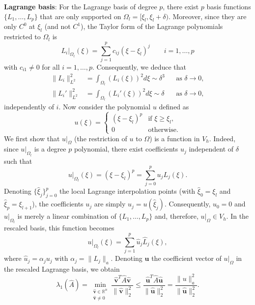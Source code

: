 \documentclass{article}
\numberwithin{equation}{section}
\newcommand{\dxi}{d\xi}
\newcommand{\restr}[2]{\left.{#1}\right|_{#2}}
\theoremstyle{definition}
\begin{document}
\noindent \textbf{Lagrange basis}:
For the Lagrange basis of degree $p$, there exist $p$ basis functions $\{L_1,\dots,L_p\}$ that are only supported on $\Omega_l = [\xi_l,\xi_l+\delta)$. Moreover, since they are only $C^0$ at $\xi_l$ (and not $C^1$), the Taylor form of the Lagrange polynomials restricted to $\Omega_l$ is
\begin{equation*}
    \restr{L_i}{\Omega_l}(\xi) = \sum_{j=1}^p c_{ij}(\xi-\xi_l)^j \qquad i=1,\dots,p
\end{equation*}
with $c_{i1} \neq 0$ for all $i=1,\dots,p$. Consequently, we deduce that
\begin{align}
    \|L_i\|_{L^2}^2 &= \int_{\Omega_l} (L_i(\xi))^2 \dxi \sim \delta^{3} & &\text{as } \delta \to 0, \label{eq: L2_Lagrange} \\
    \|L_i'\|_{L^2}^2 &= \int_{\Omega_l} (L_i'(\xi))^2 \dxi \sim \delta & &\text{as } \delta \to 0, \label{eq: H1_Lagrange}
\end{align}
independently of $i$. Now consider the polynomial $u$ defined as
\begin{equation*}
    u(\xi) =
    \begin{cases}
        (\xi-\xi_l)^p & \text{if } \xi \geq \xi_l, \\
        0 & \text{otherwise}.
    \end{cases}
\end{equation*}
We first show that $\restr{u}{\Omega}$ (the restriction of $u$ to $\Omega$) is a function in $V_h$. Indeed, since $\restr{u}{\Omega_l}$ is a degree $p$ polynomial, there exist coefficients $u_j$ independent of $\delta$ such that
\begin{equation*}
    \restr{u}{\Omega_l}(\xi) = (\xi-\xi_l)^p = \sum_{j=0}^p u_j L_j(\xi).
\end{equation*}
Denoting $\{\hat{\xi}_j\}_{j=0}^p$ the local Lagrange interpolation points (with $\hat{\xi}_0=\xi_l$ and $\hat{\xi}_p=\xi_{l+1}$), the coefficients $u_j$ are simply $u_j = u(\hat{\xi}_j)$. Consequently, $u_0=0$ and $\restr{u}{\Omega_l}$ is merely a linear combination of $\{L_1,\dots,L_p\}$ and, therefore, $\restr{u}{\Omega} \in V_h$. In the rescaled basis, this function becomes
\begin{equation*}
    \restr{u}{\Omega_l}(\xi) = \sum_{j=1}^p \hat{u}_j \hat{L}_j(\xi),
\end{equation*}
where $\hat{u}_j = \alpha_ju_j$ with $\alpha_j=\|L_j\|_a$. Denoting $\hat{\bm{u}}$ the coefficient vector of $\restr{u}{\Omega}$ in the rescaled Lagrange basis, we obtain
\begin{equation}
\label{eq: upper_bound_lambda_min}
    \lambda_1(\hat{A}) = \min_{\substack{\hat{\bm{v}} \in \mathbb{R}^n \\ \hat{\bm{v}} \neq 0}} \frac{\hat{\bm{v}}^T\hat{A}\hat{\bm{v}}}{\|\hat{\bm{v}}\|_2^2} \leq \frac{\hat{\bm{u}}^T\hat{A}\hat{\bm{u}}}{\|\hat{\bm{u}}\|_2^2} = \frac{\|u\|_a^2}{\|\hat{\bm{u}}\|_2^2}.
\end{equation}
\end{document}
